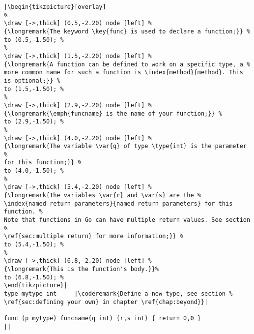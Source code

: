 \begin{lstlisting}[caption=A function definition,label=src:function definition]
|\begin{tikzpicture}[overlay]
%
\draw [->,thick] (0.5,-2.20) node [left] %
{\longremark{The keyword \key{func} is used to declare a function;}} %
to (0.5,-1.50); %
%
\draw [->,thick] (1.5,-2.20) node [left] %
{\longremark{A function can be defined to work on a specific type, a %
more common name for such a function is \index{method}{method}. This is optional;}} %
to (1.5,-1.50); %
%
\draw [->,thick] (2.9,-2.20) node [left] %
{\longremark{\emph{funcname} is the name of your function;}} %
to (2.9,-1.50); %
%
\draw [->,thick] (4.0,-2.20) node [left] %
{\longremark{The variable \var{q} of type \type{int} is the parameter %
for this function;}} %
to (4.0,-1.50); %
%
\draw [->,thick] (5.4,-2.20) node [left] %
{\longremark{The variables \var{r} and \var{s} are the %
\index{named return parameters}{named return parameters} for this function. %
Note that functions in Go can have multiple return values. See section %
\ref{sec:multiple return} for more information;}} %
to (5.4,-1.50); %
%
\draw [->,thick] (6.8,-2.20) node [left] %
{\longremark{This is the function's body.}}%
to (6.8,-1.50); %
\end{tikzpicture}|
type mytype int	    |\coderemark{Define a new type, see section %
\ref{sec:defining your own} in chapter \ref{chap:beyond}}|

func (p mytype) funcname(q int) (r,s int) { return 0,0 }
||
\end{lstlisting}
